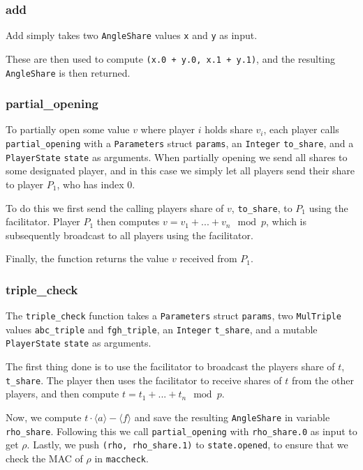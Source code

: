 \documentclass[../main.tex]{subfiles}
\begin{document}
\subsubsection{add}
Add simply takes two \lstinline{AngleShare} values \lstinline{x} and \lstinline{y} as input.

These are then used to compute \lstinline{(x.0 + y.0, x.1 + y.1)}, and the resulting \lstinline{AngleShare} is then returned.
\subsubsection{partial\_opening}
To partially open some value $v$ where player $i$ holds share $v_i$, each player calls \lstinline{partial_opening} with a \lstinline{Parameters} struct \lstinline{params}, an \lstinline{Integer} \lstinline{to_share}, and a \lstinline{PlayerState}  \lstinline{state} as arguments. When partially opening we send all shares to some designated player, and in this case we simply let all players send their share to player $P_1$, who has index $0$.

To do this we first send the calling players share of $v$, \lstinline{to_share}, to $P_1$ using the facilitator. Player $P_1$ then computes $v = v_1 + ... + v_n \mod p$, which is subsequently broadcast to all players using the facilitator.

Finally, the function returns the value $v$ received from $P_1$.

\subsubsection{triple\_check}
The \lstinline{triple_check} function takes a \lstinline{Parameters} struct \lstinline{params}, two \lstinline{MulTriple} values \lstinline{abc_triple} and \lstinline{fgh_triple}, an \lstinline{Integer} \lstinline{t_share}, and a mutable \lstinline{PlayerState} \lstinline{state} as arguments.

The first thing done is to use the facilitator to broadcast the players share of $t$, \lstinline{t_share}. The player then uses the facilitator to receive shares of $t$ from the other players, and then compute $t = t_1 + ... + t_n \mod p$.

Now, we compute $t \cdot \langle a \rangle - \langle f \rangle$ and save the resulting \lstinline{AngleShare} in variable \lstinline{rho_share}. Following this we call \lstinline{partial_opening} with \lstinline{rho_share.0} as input to get $\rho$. Lastly, we push \lstinline{(rho, rho_share.1)} to \lstinline{state.opened}, to ensure that we check the MAC of $\rho$ in \lstinline{maccheck}.
\end{document}
